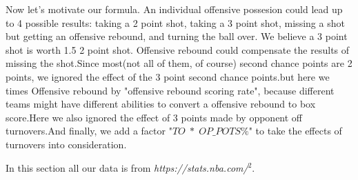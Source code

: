 \documentclass[11pt]{article}
\begin{document}
Now let's motivate our formula. An individual offensive possesion could lead up to 4 possible results: taking a 2 point shot, taking a 3 point shot, missing a shot but getting an offensive rebound, and turning the ball over. We believe a 3 point shot is worth 1.5 2 point shot. Offensive rebound could compensate the results of missing the shot.Since most(not all of them, of course) second chance points are 2 points, we ignored the effect of the 3 point second chance points.but here we times Offensive rebound by "offensive rebound scoring rate", because different teams might have different abilities to convert a offensive rebound to box score.Here we also ignored the effect of 3 points made by opponent off turnovers.And finally, we add a factor "$TO\; * \;OP\_POTS\%$" to take the effects of turnovers into consideration.

In this section all our data is from \textit{https://stats.nba.com/}$^2$.
\end{document}
